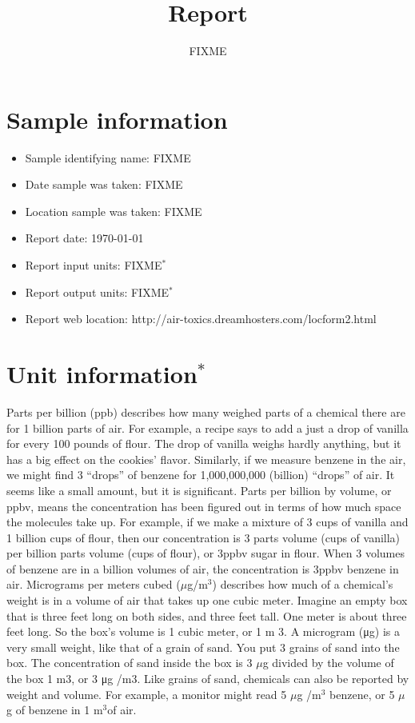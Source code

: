 \documentclass{article}
\newcommand{\cubed}{$^3$}
\newcommand{\micro}{$\mu$}
\newcommand{\user}          {FIXME}
\newcommand{\samplename}    {FIXME}
\newcommand{\sampledate}    {FIXME}
\newcommand{\samplelocation}{FIXME}
\newcommand{\inunits}       {FIXME}
\newcommand{\outunits}      {FIXME}
\begin{document}
\title{Report}
\author{\user}
\date{}
\maketitle

\section*{Sample information}
\begin{itemize}
\item Sample identifying name:   \samplename
\item Date sample was taken:     \sampledate
\item Location sample was taken: \samplelocation
\item Report date:               \today
\item Report input units:        \inunits$^*$
\item Report output units:       \outunits$^*$
\item Report web location: http://air-toxics.dreamhosters.com/locform2.html
\end{itemize}

\section*{Unit information$^*$}
Parts per billion (ppb) describes how many weighed parts of a chemical there
are for 1 billion parts of air. For example, a recipe says to add a just a drop of
vanilla for every 100 pounds of flour. The drop of vanilla weighs hardly
anything, but it has a big effect on the cookies’ flavor. Similarly, if we measure
benzene in the air, we might find 3 “drops” of benzene for 1,000,000,000
(billion) “drops” of air. It seems like a small amount, but it is significant.
Parts per billion by volume, or ppbv, means the concentration has been figured
out in terms of how much space the molecules take up. For example, if we
make a mixture of 3 cups of vanilla and 1 billion cups of flour, then our
concentration is 3 parts volume (cups of vanilla) per billion parts volume (cups
of flour), or 3ppbv sugar in flour. When 3 volumes of benzene are in a billion
volumes of air, the concentration is 3ppbv benzene in air.
Micrograms per meters cubed (\micro g/m\cubed) describes how much of a chemical’s
weight is in a volume of air that takes up one cubic meter. Imagine an empty
box that is three feet long on both sides, and three feet tall. One meter is about
three feet long. So the box’s volume is 1 cubic meter, or 1 m 3. A microgram
(μg) is a very small weight, like that of a grain of sand. You put 3 grains of sand
into the box. The concentration of sand inside the box is 3 \micro g divided by the
volume of the box 1 m3, or 3 μg /m3. Like grains of sand, chemicals can also be
reported by weight and volume. For example, a monitor might read 5 \micro g /m\cubed
benzene, or 5 \micro g of benzene in 1 m\cubed of air.
\end{document}
